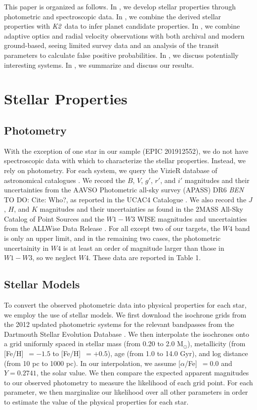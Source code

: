 \documentclass{emulateapj}
\newcommand{\project}[1]{\textsl{#1}}
\newcommand{\KT}{\project{K2}}
\newcommand{\msun}{{M$_\odot$}}
\newcommand{\feh}{{[Fe/H]}~}
\newcommand{\afe}{{[$\alpha$/Fe]}~}
\newcommand{\todo}[3]{{\color{#2} \emph{#1} TO DO: #3}}
\newcommand{\btmtodo}[1]{\todo{BEN}{red}{#1}}
\begin{document}
This paper is organized as follows. 
In , we develop stellar properties through
photometric and spectroscopic data.
In , we combine the derived stellar properties with \KT\ data to infer planet
candidate properties.
In , we combine adaptive optics and radial velocity observations with both
archival and modern ground-based, seeing limited survey data and an analysis of the
transit parameters to calculate false positive probabilities.
In , we discuss potentially interesting systems.
In , we summarize and discuss our results.


\section{Stellar Properties}
\subsection{Photometry}

With the exception of one star in our sample (EPIC 201912552), we do not have
spectroscopic data with which to characterize the stellar properties. 
Instead, we rely on photometry.
For each system, we query the VizieR database of astronomical catalogues
\citep{Ochseinbein00}. 
We record the $B$, $V$, $g'$, $r'$, and $i'$ magnitudes and their
uncertainties from the AAVSO Photometric all-sky survey (APASS) DR6 
\btmtodo{Cite: Who?}, as reported in the UCAC4 Catalogue \citep{Zacharias12}.
We also record the $J$, $H$, and $K$ magnitudes and their uncertainties 
as found in the 2MASS All-Sky Catalog of Point Sources \citep{Cutri03}
and the $W1-W3$ WISE magnitudes and uncertainties from the ALLWise Data
Release \citep{Cutri13}.
For all except two of our targets, the $W4$ band is only an upper limit,
and in the remaining two cases, the photometric uncertainity in $W4$ is at least an 
order of magnitude larger than those in $W1-W3$, so we neglect $W4$.
These data are reported in Table 1.


\subsection{Stellar Models}
To convert the observed photometric data into physical properties for each
star, we employ the use of stellar models. 
We first download the isochrone grids from the 2012 updated photometric
systems for the relevant bandpasses from the Dartmouth Stellar Evolution
Database \citep{Dotter08}. 
We then interpolate the isochrones onto a grid uniformly spaced in
stellar mass (from 0.20 to 2.0 \msun), metallicity (from \feh$=-1.5$ to 
\feh$=+0.5$), age (from 1.0 to 14.0 Gyr), and log distance (from 10 pc to 
1000 pc). 
In our interpolation, we assume \afe$=0.0$ and $Y=0.2741$, the solar value.
We then compare the expected apparent magnitudes to our observed photometry
to measure the likelihood of each grid point.
For each parameter, we then marginalize our likelihood over all other 
parameters in order to estimate the value of the physical properties
for each star.
\end{document}
